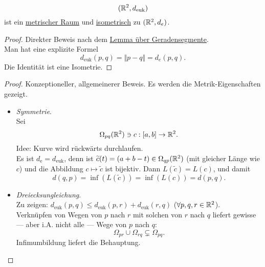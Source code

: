 \begin{theorem}
  \begin{equation*}
    (\mathbb{R}^2, d_\text{euk})
  \end{equation*}
  ist ein \hyperref[def:metrischerRaum]{metrischer Raum} und \hyperref[def:isometrie]{isometrisch} zu $ (\mathbb{R}^2, d_e) $.
  \begin{proof}
    Direkter Beweis nach dem \hyperref[lemma:geradenkurz]{Lemma über Geradensegmente}. \\
    Man hat eine explizite Formel
    \begin{equation*}
      d_{\text{euk}}(p,q) = \Vert p - q \Vert = d_e(p,q)\text{.}
    \end{equation*}
    Die Identität ist eine Isometrie.
  \end{proof}
  \begin{proof}
    Konzeptioneller, allgemeinerer Beweis. Es werden die Metrik-Eigenschaften gezeigt. \\
    \begin{itemize}
      \item \emph{Symmetrie}. \\
        Sei
        \begin{equation*}
          \Omega_{pq}(\mathbb{R}^2) \ni c: [a,b] \to \mathbb{R}^2\text{.}
       \end{equation*}
       Idee: Kurve wird rückwärts durchlaufen. \\
       Es ist $ d_\text{e} = d_\text{euk} $, denn ist $ \widetilde{c}(t) = (a+b-t) \in \Omega_{qp}(\mathbb{R}^2) $ (mit gleicher Länge wie $ c $) und die Abbildung $ c \mapsto \widetilde{c} $ ist bijektiv. Dann $ L(\widetilde{c}) = L(c) $, und damit
       \begin{equation*}
         d(q,p) = \inf(L(\widetilde{c})) = \inf(L(c)) = d(p,q)\text{.}
       \end{equation*}

      \item \emph{Dreiecksungleichung}. \\
        Zu zeigen: $ d_\text{euk}(p,q) \leq d_\text{euk}(p,r) + d_\text{euk}(r,q) $ ($ \forall p, q, r \in \mathbb{R}^2 $). \\
        Verknüpfen von Wegen von $ p $ nach $ r $ mit solchen von $ r $ nach $ q $ liefert gewisse --- aber i.A. nicht alle --- Wege von $ p $ nach $ q $:
        \begin{equation*}
          \Omega_{pr} \cup \Omega_{rq} \subsetneq \Omega_{pq}\text{.}
        \end{equation*}
        Infimumbildung liefert die Behauptung.


\end{itemize}
\end{proof}
\end{theorem}
